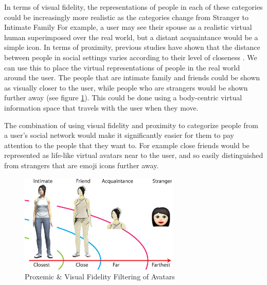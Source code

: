 In terms of visual fidelity, the representations of people in each of these categories could be increasingly more realistic as the categories change from Stranger to Intimate Family 
For example, a user may see their spouse as a realistic virtual human superimposed over the real world, but a distant acquaintance would be a simple icon.
In terms of proximity, previous studies have shown that the distance between people in social settings varies according to their level of closeness \cite{Anslow2016}. We can use this to place the virtual representations of people in the real world around the user. The people that are intimate family and friends could be shown as visually closer to the user, while people who are strangers would be shown further away (see figure \ref{fig:contacts:proximic-circles}). This could be done using a body-centric virtual information space that travels with the user when they move.

The combination of using visual fidelity and proximity to categorize people from a user's social network would make it significantly easier for them to pay attention to the people that they want to. For example close friends would be represented as life-like virtual avatars near to the user, and so easily distinguished from strangers that are emoji icons further away.

\begin{figure}[ht]
  \centering
  \includegraphics[width=3in]{images/writing-images-11.eps}
  \caption{Proxemic \& Visual Fidelity Filtering of Avatars}
	\label{fig:contacts:proximic-circles}
\end{figure}



